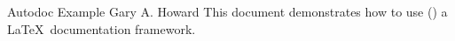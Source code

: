 \documentclass[10pt]{tlc-article}%
\begin{document}
%
  \tlcTitlePageAndTableOfContents%
    {Autodoc Example}%
    {Gary A. Howard}%
    {This document demonstrates how to use (\adAutoDoc) a \LaTeX\ documentation
     framework.}%











\printGlossaries%

\end{document}

